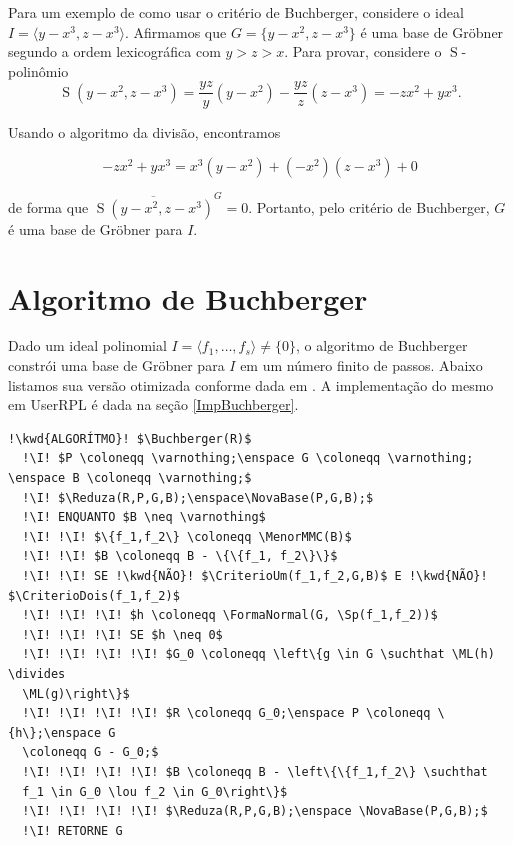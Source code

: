\documentclass[12pt,a4paper]{report}
\newcommand{\kwd}[1]{\texttt{\textcolor{keyword}{#1}}}
\newcommand{\I}{\enspace\textcolor{indent}\vrule\hspace{2pt}}
\newcommand{\lou}{\enspace\lor\enspace}
\newcommand{\suchthat}{\enspace\middle|\enspace}
\newcommand{\divides}{\parallel}
\numberwithin{theorem}{chapter}
\DeclareMathOperator{\ML}{ML}
\DeclareMathOperator{\Sp}{S}
\DeclareMathOperator{\Reduza}{Reduza}
\DeclareMathOperator{\NovaBase}{NovaBase}
\DeclareMathOperator{\MenorMMC}{MenorMMC}
\DeclareMathOperator{\CriterioUm}{Crit\acute{e}rio1}
\DeclareMathOperator{\CriterioDois}{Crit\acute{e}rio2}
\DeclareMathOperator{\FormaNormal}{FormaNormal}
\DeclareMathOperator{\Buchberger}{Buchberger}
\begin{document}
Para um exemplo de como usar o critério de Buchberger, considere o
ideal \(I = \langle y-x^3, z-x^3 \rangle\).  Afirmamos que \(G =
\{y-x^2,z-x^3\}\) é uma base de Gröbner segundo a ordem lexicográfica
com \(y > z > x\).  Para provar, considere o \(\Sp\)-polinômio
\[
\Sp(y-x^2,z-x^3) = \frac{y z}{y}(y-x^2) - \frac{y z}{z}(z-x^3) =
-zx^2+yx^3.
\]

Usando o algoritmo da divisão, encontramos

\[
-z x^2+ y x^3 = x^3(y-x^2)+(-x^2)(z-x^3)+0
\]

de forma que \(\overline{\Sp(y-x^2,z-x^3)}^G = 0\).  Portanto, pelo
critério de Buchberger, \(G\) é uma base de Gröbner para \(I\).




\chapter{Algoritmo de Buchberger}\label{AlgBuchberger}

Dado um ideal polinomial \(I = \langle f_1,\ldots,f_s \rangle \neq
\{0\}\), o algoritmo de Buchberger constrói uma base de Gröbner para
\(I\) em um número finito de passos.  Abaixo listamos sua versão
otimizada conforme dada em \cite[p. 196, 197]{B}.  A implementação do
mesmo em UserRPL é dada na seção \ref{ImpBuchberger}.

\vspace{1cm}

\begin{lstlisting}[language=algorithm]
  !\kwd{ALGORÍTMO}! $\Buchberger(R)$
  !\I! $P \coloneqq \varnothing;\enspace G \coloneqq \varnothing; \enspace B \coloneqq \varnothing;$
  !\I! $\Reduza(R,P,G,B);\enspace\NovaBase(P,G,B);$
  !\I! ENQUANTO $B \neq \varnothing$
  !\I! !\I! $\{f_1,f_2\} \coloneqq \MenorMMC(B)$
  !\I! !\I! $B \coloneqq B - \{\{f_1, f_2\}\}$
  !\I! !\I! SE !\kwd{NÃO}! $\CriterioUm(f_1,f_2,G,B)$ E !\kwd{NÃO}! $\CriterioDois(f_1,f_2)$
  !\I! !\I! !\I! $h \coloneqq \FormaNormal(G, \Sp(f_1,f_2))$
  !\I! !\I! !\I! SE $h \neq 0$
  !\I! !\I! !\I! !\I! $G_0 \coloneqq \left\{g \in G \suchthat \ML(h) \divides
  \ML(g)\right\}$
  !\I! !\I! !\I! !\I! $R \coloneqq G_0;\enspace P \coloneqq \{h\};\enspace G
  \coloneqq G - G_0;$
  !\I! !\I! !\I! !\I! $B \coloneqq B - \left\{\{f_1,f_2\} \suchthat
  f_1 \in G_0 \lou f_2 \in G_0\right\}$
  !\I! !\I! !\I! !\I! $\Reduza(R,P,G,B);\enspace \NovaBase(P,G,B);$
  !\I! RETORNE G
\end{lstlisting}
\end{document}

